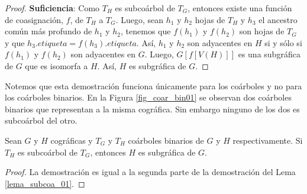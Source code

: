\begin{proof}
    \textbf{Suficiencia}: Como $T_H$ es subcoárbol de $T_G$, entonces existe
    una función de coasignación, $f$, de $T_H$ a $T_G$. Luego, sean $h_1$ y
    $h_2$ hojas de $T_H$ y $h_3$ el ancestro común más profundo de $h_1$ y
    $h_2$, tenemos que $f(h_1)$ y $f(h_2)$ son hojas de $T_G$ y que
    $h_3.etiqueta = f(h_3).etiqueta$. Así, $h_1$ y $h_2$ son adyacentes en $H$
    si y sólo si $f(h_1)$ y $f(h_2)$ son adyacentes en $G$. Luego, $G[f[V(H)]]$
    es una subgráfica de $G$ que es isomorfa a $H$. Así, $H$ es subgráfica de
    $G$.

\end{proof}

Notemos que esta demostración funciona únicamente para los coárboles y no para los coárboles binarios. En la Figura \ref{fig_coar_bin01} se observan dos coárboles binarios que representan a la misma cográfica. Sin embargo ninguno de los dos es subcoárbol del otro.

\begin{lemma}
    Sean $G$ y $H$ cográficas y $T_G$ y $T_H$ coárboles binarios de $G$ y $H$ respectivamente. Si $T_H$ es subcoárbol de $T_G$, entonces $H$ es subgráfica de $G$.
\end{lemma}

\begin{proof}
    La demostración es igual a la segunda parte de la demostración del Lema \ref{lema_subcoa_01}.
\end{proof}
